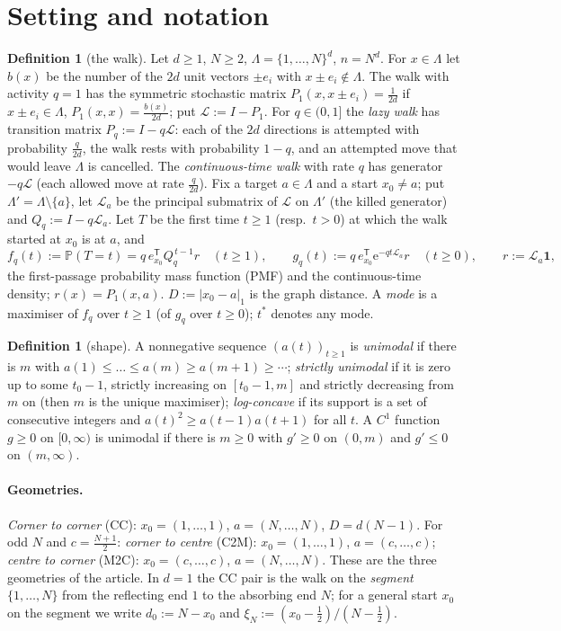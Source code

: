 \documentclass[10pt,a4paper]{article}
\theoremstyle{plain}
\theoremstyle{definition}
\newtheorem{definition}[theorem]{Definition}
\renewcommand{\P}{\mathbb{P}}
\newcommand{\Lg}{\mathcal{L}}
\newcommand{\ee}{\mathrm{e}}
\begin{document}
\section{Setting and notation}\label{sec:setting}

\begin{definition}[the walk]\label{def:walk}
Let $d\ge1$, $N\ge2$, $\Lambda=\{1,\dots,N\}^d$, $n=N^d$. For $x\in\Lambda$ let $b(x)$ be the number of the $2d$ unit vectors $\pm e_i$ with $x\pm e_i\notin\Lambda$. The walk with activity $q=1$ has the symmetric stochastic matrix $P_1(x,x\pm e_i)=\frac1{2d}$ if $x\pm e_i\in\Lambda$, $P_1(x,x)=\frac{b(x)}{2d}$; put $\Lg:=I-P_1$. For $q\in(0,1]$ the \emph{lazy walk} has transition matrix $P_q:=I-q\Lg$: each of the $2d$ directions is attempted with probability $\frac q{2d}$, the walk rests with probability $1-q$, and an attempted move that would leave $\Lambda$ is cancelled. The \emph{continuous-time walk} with rate $q$ has generator $-q\Lg$ (each allowed move at rate $\frac q{2d}$). Fix a target $a\in\Lambda$ and a start $x_0\ne a$; put $\Lambda'=\Lambda\setminus\{a\}$, let $\Lg_a$ be the principal submatrix of $\Lg$ on $\Lambda'$ (the killed generator) and $Q_q:=I-q\Lg_a$. Let $T$ be the first time $t\ge1$ (resp.\ $t>0$) at which the walk started at $x_0$ is at $a$, and
\[
f_q(t):=\P(T=t)=q\,e_{x_0}^{\mathsf T}Q_q^{\,t-1}r\quad(t\ge1),\qquad g_q(t):=q\,e_{x_0}^{\mathsf T}\ee^{-qt\Lg_a}r\quad(t\ge0),\qquad r:=\Lg_a\mathbf 1 ,
\]
the first-passage probability mass function (PMF) and the continuous-time density; $r(x)=P_1(x,a)$. $D:=|x_0-a|_1$ is the graph distance. A \emph{mode} is a maximiser of $f_q$ over $t\ge1$ (of $g_q$ over $t\ge0$); $t^*$ denotes any mode.
\end{definition}

\begin{definition}[shape]\label{def:shape}
A nonnegative sequence $(a(t))_{t\ge1}$ is \emph{unimodal} if there is $m$ with $a(1)\le\dots\le a(m)\ge a(m+1)\ge\cdots$; \emph{strictly unimodal} if it is zero up to some $t_0-1$, strictly increasing on $[t_0-1,m]$ and strictly decreasing from $m$ on (then $m$ is the unique maximiser); \emph{log-concave} if its support is a set of consecutive integers and $a(t)^2\ge a(t-1)a(t+1)$ for all $t$. A $C^1$ function $g\ge0$ on $[0,\infty)$ is unimodal if there is $m\ge0$ with $g'\ge0$ on $(0,m)$ and $g'\le0$ on $(m,\infty)$.
\end{definition}

\paragraph{Geometries.} \emph{Corner to corner} (CC): $x_0=(1,\dots,1)$, $a=(N,\dots,N)$, $D=d(N-1)$. For odd $N$ and $c=\frac{N+1}2$: \emph{corner to centre} (C2M): $x_0=(1,\dots,1)$, $a=(c,\dots,c)$; \emph{centre to corner} (M2C): $x_0=(c,\dots,c)$, $a=(N,\dots,N)$. These are the three geometries of the article. In $d=1$ the CC pair is the walk on the \emph{segment} $\{1,\dots,N\}$ from the reflecting end $1$ to the absorbing end $N$; for a general start $x_0$ on the segment we write $d_0:=N-x_0$ and $\xi_N:=(x_0-\frac12)/(N-\frac12)$.
\end{document}
